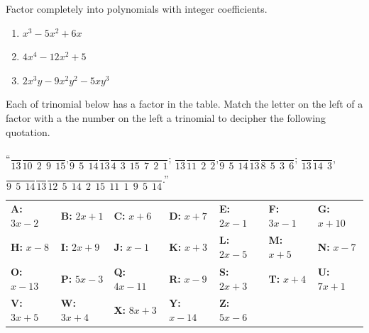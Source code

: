 \documentclass[en,11pt]{elegantbook}
\let\BeginKnitrBlock\begin \let\EndKnitrBlock\end
\begin{document}
\BeginKnitrBlock{exercise}
\protect\hypertarget{exr:unnamed-chunk-30}{}{\label{exr:unnamed-chunk-30} }
Factor completely into polynomials with integer coefficients.

\begin{enumerate}
\def\labelenumi{\arabic{enumi}.}

\item
  \(x^3-5x^2+6x\)
\item
  \(4x^4-12x^2+5\)
\item
  \(2x^3y-9x^2y^2-5xy^3\)
\end{enumerate}
\EndKnitrBlock{exercise}

\BeginKnitrBlock{exercise}
\protect\hypertarget{exr:unnamed-chunk-31}{}{\label{exr:unnamed-chunk-31} }
Each of trinomial below has a factor in the table. Match the letter on the left of a factor with a the number on the left a trinomial to decipher the following quotation.

``\(\dfrac{\phantom{A}}{13}\)\quad \(\dfrac{\phantom{A}}{10~~2~~9~~15}\),\quad \(\dfrac{\phantom{A}}{9~~5~~14}\)\quad \(\dfrac{\phantom{A}}{13}\)\quad \(\dfrac{\phantom{A}}{4~~3~~15~~7~~2~~1}\);
\phantom{"} \(\dfrac{\phantom{A}}{13}\)\quad \(\dfrac{\phantom{A}}{11~~2~~2}\),\quad \(\dfrac{\phantom{A}}{9~~5~~14}\)\quad \(\dfrac{\phantom{A}}{13}\)\quad \(\dfrac{\phantom{A}}{8~~5~~3~~6}\);
\phantom{"} \(\dfrac{\phantom{A}}{13}\)\quad \(\dfrac{\phantom{A}}{14~~3}\),\quad \(\dfrac{\phantom{A}}{9~~5~~14}\)\quad \(\dfrac{\phantom{A}}{13}\)\quad \(\dfrac{\phantom{A}}{12~~5~~14~~2~~15~~11~~1~~9~~5~~14}\).''

\begin{longtable}[]{@{}lllllll@{}}
\toprule
\endhead
\textbf{A:} \(3x-2\) & \textbf{B:} \(2x+1\) & \textbf{C:} \(x+6\) & \textbf{D:} \(x+7\) & \textbf{E:} \(2x-1\) & \textbf{F:} \(3x-1\) & \textbf{G:} \(x+10\)\tabularnewline
\textbf{H:} \(x-8\) & \textbf{I:} \(2x+9\) & \textbf{J:} \(x-1\) & \textbf{K:} \(x+3\) & \textbf{L:} \(2x-5\) & \textbf{M:} \(x+5\) & \textbf{N:} \(x-7\)\tabularnewline
\textbf{O:} \(x-13\) & \textbf{P:} \(5x-3\) & \textbf{Q:} \(4x-11\) & \textbf{R:} \(x-9\) & \textbf{S:} \(2x+3\) & \textbf{T:} \(x+4\) & \textbf{U:} \(7x+1\)\tabularnewline
\textbf{V:} \(3x+5\) & \textbf{W:} \(3x+4\) & \textbf{X:} \(8x+3\) & \textbf{Y:} \(x-14\) & \textbf{Z:} \(5x-6\) & &\tabularnewline
\bottomrule
\end{longtable}
\EndKnitrBlock{exercise}
\end{document}
